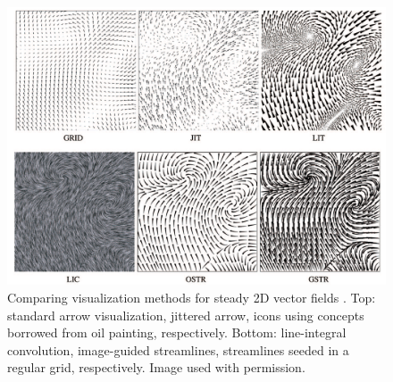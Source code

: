  \begin{figure}[t]
 	\centering
       \includegraphics[width=1\linewidth]{chapter6/figures/ust_kirby}
   \caption{Comparing visualization methods for steady 2D vector fields \cite{Laidlaw:2005:CVF:1032290.1032538}. Top: standard arrow visualization, jittered arrow, icons using concepts borrowed from oil painting, respectively. Bottom: line-integral convolution, image-guided streamlines, streamlines seeded in a regular grid, respectively. Image used with permission.}
   \label{fig:user_study}
 \end{figure}




